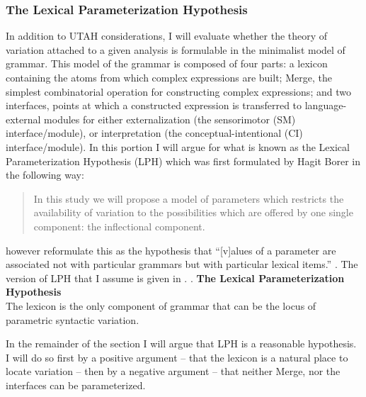 \documentclass[MilwayThesis]{subfiles}
\begin{document}
\subsubsection{The Lexical Parameterization Hypothesis}
In addition to UTAH considerations, I will evaluate whether the theory of variation attached to a given analysis is formulable in the minimalist model of grammar.
This model of the grammar is composed of four parts:
	a lexicon containing the atoms from which complex expressions are built;
	Merge, the simplest combinatorial operation for constructing complex expressions; 
	and two interfaces, points at which a constructed expression is transferred to language-external modules for either externalization (the sensorimotor (SM) interface/module), or interpretation (the conceptual-intentional (CI) interface/module).
In this portion I will argue for what is known as the Lexical Parameterization Hypothesis (LPH) which was first formulated by Hagit Borer in the following way:
\begin{quote}
	In this study we will propose a model of parameters which restricts the availability of variation to the possibilities which are offered by one single component: the inflectional component. \parencite[3]{borer1984parametric}
\end{quote}
\textcite{manzini1987parameters} however reformulate this as the hypothesis that ``[v]alues of a parameter are associated not with particular grammars but with particular lexical items.'' \parencite[424]{manzini1987parameters}.
The version of LPH that I assume is given in \Next.
\ex. \textbf{The Lexical Parameterization Hypothesis}\\
The lexicon is the only component of grammar that can be the locus of parametric syntactic variation.

In the remainder of the section I will argue that LPH is a reasonable hypothesis.
I will do so first by a positive argument -- that the lexicon is a natural place to locate variation -- then by a negative argument -- that neither Merge, nor the interfaces can be parameterized.
\end{document}
